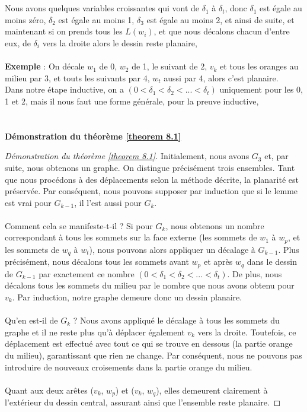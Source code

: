\documentclass[hidelinks,letterpaper,12pt]{article}
\newcounter{Exemple} %
\begin{document}
\\ \\
Nous avons quelques variables croissantes qui vont de $\delta_1$ à $\delta_t$, donc $\delta_1$ est égale au moins zéro, $\delta_2$ est égale au moins 1, $\delta_3$ est égale au moins 2, et ainsi de suite, et maintenant si on prends tous les $L(w_i)$, et que nous décalons chacun d'entre eux, de $\delta_i$ vers la droite alors le dessin reste planaire, 
\\ \\
\textbf{Exemple} : On décale $w_1$ de 0, $w_2$ de 1, le suivant de 2, $v_k$ et tous les oranges au milieu par 3, et touts les suivants par 4, $w_t$ aussi par 4, alors c'est planaire.
\\
Dans notre étape inductive, on a $(0 < \delta_1 < \delta_2 < ... < \delta_t)$ uniquement pour les 0, 1 et 2, mais il nous faut une forme générale, pour la preuve inductive,
\\  \\ \\
\textbf{Démonstration du théorème \ref{theorem 8.1}}
\begin{proof} [Démonstration du théorème \ref{theorem 8.1}]
Initialement, nous avons $G_3$ et, par suite, nous obtenons un graphe. On distingue précisément trois ensembles. Tant que nous procédons à des déplacements selon la méthode décrite, la planarité est préservée. Par conséquent, nous pouvons supposer par induction que si le lemme est vrai pour $G_{k-1}$, il l'est aussi pour $G_k$.
\\  \\
Comment cela se manifeste-t-il ? Si pour $G_k$, nous obtenons un nombre correspondant à tous les sommets sur la face externe (les sommets de $w_1$ à $w_p$, et les sommets de $w_q$ à $w_t$), nous pouvons alors appliquer un décalage à $G_{k-1}$. Plus précisément, nous décalons tous les sommets avant $w_p$ et après $w_q$ dans le dessin de $G_{k-1}$ par exactement ce nombre $(0 < \delta_1 < \delta_2 < ... < \delta_t)$. De plus, nous décalons tous les sommets du milieu par le nombre que nous avons obtenu pour $v_k$. Par induction, notre graphe demeure donc un dessin planaire.
\\ \\
Qu'en est-il de $G_k$ ? Nous avons appliqué le décalage à tous les sommets du graphe et il ne reste plus qu'à déplacer également $v_k$ vers la droite. Toutefois, ce déplacement est effectué avec tout ce qui se trouve en dessous (la partie orange du milieu), garantissant que rien ne change. Par conséquent, nous ne pouvons pas introduire de nouveaux croisements dans la partie orange du milieu.
\\ \\
Quant aux deux arêtes ($v_k$, $w_p$) et ($v_k$, $w_q$), elles demeurent clairement à l'extérieur du dessin central, assurant ainsi que l'ensemble reste planaire.
\end{proof}
\end{document}
